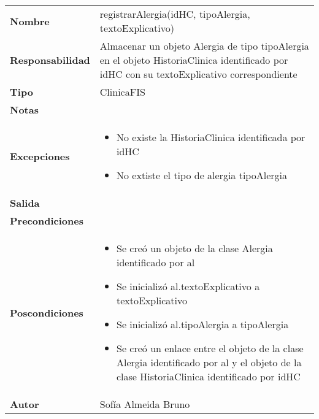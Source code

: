 \documentclass[11pt,a4paper]{article}
\begin{document}
\begin{table}[H]
\centering
\label{my-label}
\begin{tabularx}{\textwidth}{l|X}
\textbf{Nombre}          & registrarAlergia(idHC, tipoAlergia, textoExplicativo) \\
\textbf{Responsabilidad} & Almacenar un objeto Alergia de tipo tipoAlergia en el objeto HistoriaClinica identificado por idHC con su textoExplicativo correspondiente\\
\textbf{Tipo}            & ClinicaFIS \\
\textbf{Notas}           &  \\
\textbf{Excepciones}     & 
\begin{itemize}
\item No existe la HistoriaClinica identificada por idHC
\item No extiste el tipo de alergia tipoAlergia
\end{itemize}\\
\textbf{Salida}          &  \\
\textbf{Precondiciones}  &  \\
\textbf{Poscondiciones}  &
\begin{itemize}
\item Se creó un objeto de la clase Alergia identificado por al
\item Se inicializó al.textoExplicativo a textoExplicativo
\item Se inicializó al.tipoAlergia a tipoAlergia
\item Se creó un enlace entre el objeto de la clase Alergia identificado por al y el objeto de la clase HistoriaClinica identificado por idHC
\end{itemize}\\
\textbf{Autor}           & Sofía Almeida Bruno
\end{tabularx}
\end{table}
\end{document}
